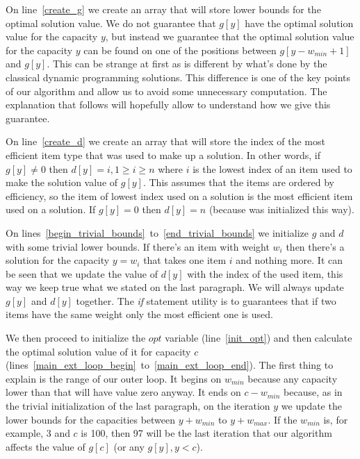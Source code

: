 \documentclass[12pt]{article}
\begin{document}
On line~\ref{create_g} we create an array that will store lower bounds for the optimal solution value. We do not guarantee that \(g[y]\) have the optimal solution value for the capacity \(y\), but instead we guarantee that the optimal solution value for the capacity \(y\) can be found on one of the positions between \(g[y-w_{min}+1]\) and \(g[y]\). This can be strange at first as is different by what's done by the classical dynamic programming solutions. This difference is one of the key points of our algorithm and allow us to avoid some unnecessary computation. The explanation that follows will hopefully allow to understand how we give this guarantee.

On line~\ref{create_d} we create an array that will store the index of the most efficient item type that was used to make up a solution. In other words, if \(g[y] \neq 0\) then \(d[y] = i, 1 \geq i \geq n\) where \(i\) is the lowest index of an item used to make the solution value of \(g[y]\). This assumes that the items are ordered by efficiency, so the item of lowest index used on a solution is the most efficient item used on a solution. If \(g[y] = 0\) then \(d[y] = n\) (because was initialized this way).

On lines~\ref{begin_trivial_bounds}~to~\ref{end_trivial_bounds} we initialize \(g\) and \(d\) with some trivial lower bounds. If there's an item with weight \(w_i\) then there's a solution for the capacity \( y = w_i\) that takes one item \(i\) and nothing more. It can be seen that we update the value of \(d[y]\) with the index of the used item, this way we keep true what we stated on the last paragraph. We will always update \(g[y]\) and \(d[y]\) together. The \textit{if} statement utility is to guarantees that if two items have the same weight only the most efficient one is used.

We then proceed to initialize the \(opt\) variable (line~\ref{init_opt}) and then calculate the optimal solution value of it for capacity \(c\) (lines~\ref{main_ext_loop_begin}~to~\ref{main_ext_loop_end}). The first thing to explain is the range of our outer loop. It begins on \(w_{min}\) because any capacity lower than that will have value zero anyway. It ends on \(c-w_{min}\) because, as in the trivial initialization of the last paragraph, on the iteration \(y\) we update the lower bounds for the capacities between \(y+w_{min}\) to \(y+w_{max}\). If the \(w_{min}\) is, for example, 3 and \(c\) is 100, then 97 will be the last iteration that our algorithm affects the value of \(g[c]\) (or any \(g[y], y < c\)). 
\end{document}
